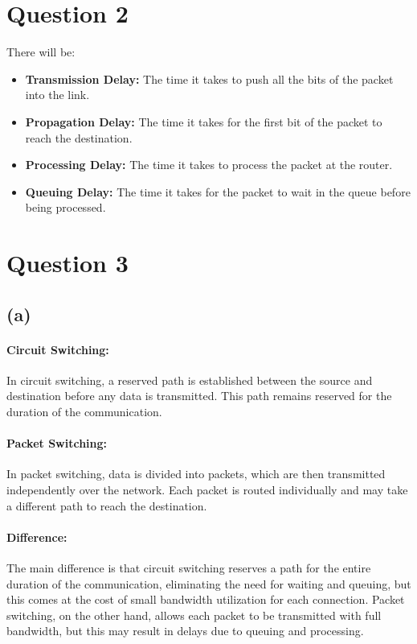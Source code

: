 \documentclass[a4paper,12pt]{article}
\begin{document}
\section*{Question 2}

There will be:
\begin{itemize}
  \item \textbf{Transmission Delay:} The time it takes to push all the bits of the packet into the link.
  \item \textbf{Propagation Delay:} The time it takes for the first bit of the packet to reach the destination.
  \item \textbf{Processing Delay:} The time it takes to process the packet at the router.
  \item \textbf{Queuing Delay:} The time it takes for the packet to wait in the queue before being processed.
\end{itemize}

\section*{Question 3}

\subsection*{(a)}

\paragraph{Circuit Switching:} In circuit switching, a reserved path is established between the source and destination before any data is transmitted. This path remains reserved for the duration of the communication.

\paragraph{Packet Switching:} In packet switching, data is divided into packets, which are then transmitted independently over the network. Each packet is routed individually and may take a different path to reach the destination.

\paragraph{Difference:} The main difference is that circuit switching reserves a path for the entire duration of the communication, eliminating the need for waiting and queuing, but this comes at the cost of small bandwidth utilization for each connection. Packet switching, on the other hand, allows each packet to be transmitted with full bandwidth, but this may result in delays due to queuing and processing.
\end{document}
